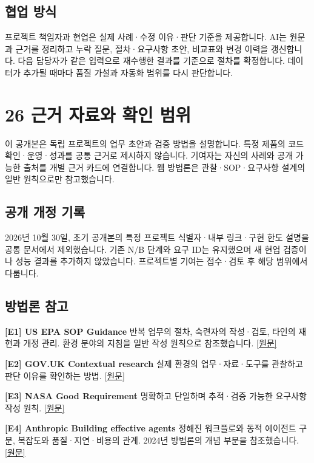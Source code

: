 \documentclass[a4paper,10pt]{article}
\begin{document}
\subsection*{협업 방식}
프로젝트 책임자과 현업은 실제 사례·수정 이유·판단 기준을 제공합니다. AI는 원문과 근거를 정리하고 누락 질문, 절차·요구사항 초안, 비교표와 변경 이력을 갱신합니다. 다음 담당자가 같은 입력으로 재수행한 결과를 기준으로 절차를 확정합니다. 데이터가 추가될 때마다 품질 가설과 자동화 범위를 다시 판단합니다.


\clearpage
\section*{26 근거 자료와 확인 범위}
이 공개본은 독립 프로젝트의 업무 초안과 검증 방법을 설명합니다. 특정 제품의 코드 확인·운영·성과를 공통 근거로 제시하지 않습니다. 기여자는 자신의 사례와 공개 가능한 출처를 개별 근거 카드에 연결합니다. 웹 방법론은 관찰·SOP·요구사항 설계의 일반 원칙으로만 참고했습니다.

\subsection*{공개 개정 기록}
2026년 10월 30일, 초기 공개본의 특정 프로젝트 식별자·내부 링크·구현 한도 설명을 공통 문서에서 제외했습니다. 기존 N/B 단계와 요구 ID는 유지했으며 새 현업 검증이나 성능 결과를 추가하지 않았습니다. 프로젝트별 기여는 접수·검토 후 해당 범위에서 다룹니다.

\subsection*{방법론 참고}
\noindent\textbf{[E1] US EPA SOP Guidance} 반복 업무의 절차, 숙련자의 작성·검토, 타인의 재현과 개정 관리. 환경 분야의 지침을 일반 작성 원칙으로 참조했습니다. \href{https://www.epa.gov/sites/default/files/2015-06/documents/g6-final.pdf}{[원문]}\par\vspace{5pt}
\noindent\textbf{[E2] GOV.UK Contextual research} 실제 환경의 업무·자료·도구를 관찰하고 판단 이유를 확인하는 방법. \href{https://www.gov.uk/service-manual/user-research/contextual-research-and-observation}{[원문]}\par\vspace{5pt}
\noindent\textbf{[E3] NASA Good Requirement} 명확하고 단일하며 추적·검증 가능한 요구사항 작성 원칙. \href{https://www.nasa.gov/reference/appendix-c-how-to-write-a-good-requirement/}{[원문]}\par\vspace{5pt}
\noindent\textbf{[E4] Anthropic Building effective agents} 정해진 워크플로와 동적 에이전트 구분, 복잡도와 품질·지연·비용의 관계. 2024년 방법론의 개념 부분을 참조했습니다. \href{https://www.anthropic.com/research/building-effective-agents}{[원문]}\par\vspace{5pt}
\end{document}
